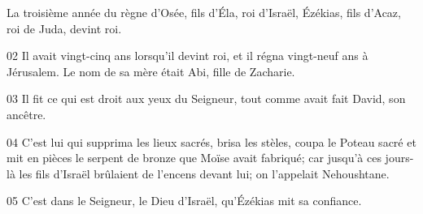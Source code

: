 La troisième année du règne d’Osée, fils d’Éla, roi d’Israël, Ézékias, fils d’Acaz, roi de Juda, devint roi.

02 Il avait vingt-cinq ans lorsqu’il devint roi, et il régna vingt-neuf ans à Jérusalem. Le nom de sa mère était Abi, fille de Zacharie.

03 Il fit ce qui est droit aux yeux du Seigneur, tout comme avait fait David, son ancêtre.

04 C’est lui qui supprima les lieux sacrés, brisa les stèles, coupa le Poteau sacré et mit en pièces le serpent de bronze que Moïse avait fabriqué; car jusqu’à ces jours-là les fils d’Israël brûlaient de l’encens devant lui; on l’appelait Nehoushtane.

05 C’est dans le Seigneur, le Dieu d’Israël, qu’Ézékias mit sa confiance.